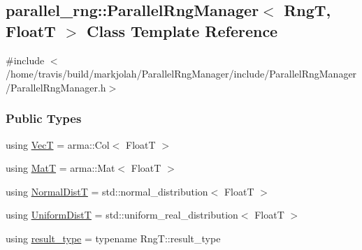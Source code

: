 \hypertarget{classparallel__rng_1_1ParallelRngManager}{\subsection{parallel\-\_\-rng\-:\-:Parallel\-Rng\-Manager$<$ Rng\-T, Float\-T $>$ Class Template Reference}
\label{classparallel__rng_1_1ParallelRngManager}
}


{\ttfamily \#include $<$/home/travis/build/markjolah/\-Parallel\-Rng\-Manager/include/\-Parallel\-Rng\-Manager/\-Parallel\-Rng\-Manager.\-h$>$}

\subsubsection*{Public Types}
\begin{DoxyCompactItemize}
\item 
using \hyperlink{classparallel__rng_1_1ParallelRngManager_a85a7225592fc063e7c0bb6d1c947f177}{Vec\-T} = arma\-::\-Col$<$ Float\-T $>$
\item 
using \hyperlink{classparallel__rng_1_1ParallelRngManager_af73ca29a72b66f92794f435a6163770d}{Mat\-T} = arma\-::\-Mat$<$ Float\-T $>$
\item 
using \hyperlink{classparallel__rng_1_1ParallelRngManager_a8eebc9754ce2a75faeca6b9736d2872f}{Normal\-Dist\-T} = std\-::normal\-\_\-distribution$<$ Float\-T $>$
\item 
using \hyperlink{classparallel__rng_1_1ParallelRngManager_a5df9dbb440b976fbc769d564dfccb597}{Uniform\-Dist\-T} = std\-::uniform\-\_\-real\-\_\-distribution$<$ Float\-T $>$
\item 
using \hyperlink{classparallel__rng_1_1ParallelRngManager_a199ad0d83c322a1f4415280002dcb386}{result\-\_\-type} = typename Rng\-T\-::result\-\_\-type
\end{DoxyCompactItemize}
